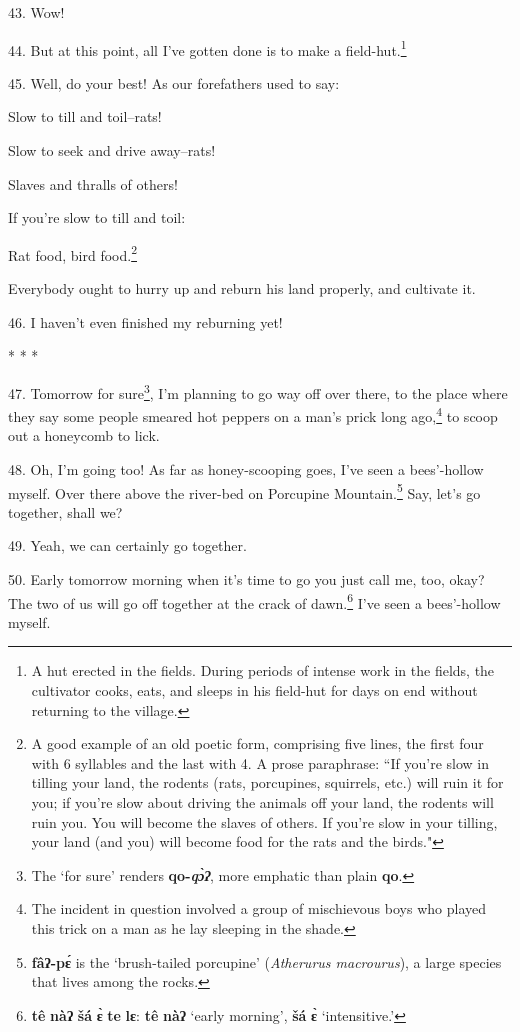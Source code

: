 43. Wow!

44. But at this point, all I've gotten done is to make a field-hut.\footnote{A hut erected in the fields. During periods of intense work in the fields, the cultivator cooks, eats, and sleeps in his field-hut for days on end without returning to the village.}

45. Well, do your best! As our forefathers used to say:

Slow to till and toil--rats!

Slow to seek and drive away--rats!

Slaves and thralls of others!

If you're slow to till and toil:

Rat food, bird food.\footnote{A good example of an old poetic form, comprising five lines, the first four with 6 syllables and the last with 4. A prose paraphrase: ``If you're slow in tilling your land, the rodents (rats, porcupines, squirrels, etc.) will ruin it for you; if you're slow about driving the animals off your land, the rodents will ruin you. You will become the slaves of others. If you're slow in your tilling, your land (and you) will become food for the rats and the birds."}

Everybody ought to hurry up and reburn his land properly, and cultivate it.

46. I haven't even finished my reburning yet!

* * *

47. Tomorrow for sure\footnote{The `for sure' renders \textbf{qo-\textit{\emph{qɔ̀ʔ}}}, more emphatic than plain \textbf{qo}.}, I'm planning to go way off over there, to the place
where they say some people smeared hot peppers on a man's prick long ago,\footnote{The incident in question involved a group of mischievous boys who played this trick on a man as he lay sleeping in the shade.} to
scoop out a honeycomb to lick.

48. Oh, I'm going too! As far as honey-scooping goes, I've seen a bees'-hollow
myself. Over there above the river-bed on Porcupine Mountain.\footnote{\textbf{fâʔ-pɛ́} is the `brush-tailed porcupine' (\textit{Atherurus macrourus}), a large species that lives among the rocks.} Say, let's go
together, shall we?

49. Yeah, we can certainly go together.

50. Early tomorrow morning when it's time to go you just call me, too, okay? The
two of us will go off together at the crack of dawn.\footnote{\textbf{tê} \textbf{nàʔ} \textbf{šá} \textbf{ɛ̀} \textbf{te} \textbf{lɛ}: \textbf{tê} \textbf{nàʔ} `early morning', \textbf{šá} \textbf{ɛ̀} `intensitive.'} I've seen a bees'-hollow
myself.

